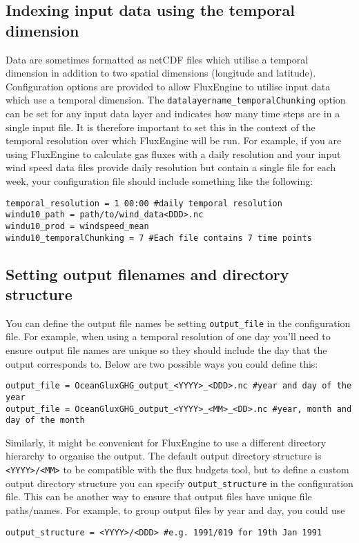 \documentclass[]{scrartcl}
\begin{document}
{\subsection{Indexing input data using the temporal dimension} \label{temporal_dimension_indexing}
Data are sometimes formatted as netCDF files which utilise a temporal dimension in addition to two spatial dimensions (longitude and latitude). Configuration options are provided to allow FluxEngine to utilise input data which use a temporal dimension. The \texttt{datalayername\_temporalChunking} option can be set for any input data layer and indicates how many time steps are in a single input file. It is therefore important to set this in the context of the temporal resolution over which FluxEngine will be run. For example, if you are using FluxEngine to calculate gas fluxes with a daily resolution and your input wind speed data files provide daily resolution but contain a single file for each week, your configuration file should include something like the following:

\begin{lstlisting}
temporal_resolution = 1 00:00 #daily temporal resolution
windu10_path = path/to/wind_data<DDD>.nc
windu10_prod = windspeed_mean
windu10_temporalChunking = 7 #Each file contains 7 time points
\end{lstlisting}


\subsection{Setting output filenames and directory structure} \label{output_filenames}
You can define the output file names be setting \texttt{output\_file} in the configuration file. For example, when using a temporal resolution of one day you'll need to ensure output file names are unique so they should include the day that the output corresponds to. Below are two possible ways you could define this:
\begin{lstlisting}
output_file = OceanGluxGHG_output_<YYYY>_<DDD>.nc #year and day of the year
output_file = OceanGluxGHG_output_<YYYY>_<MM>_<DD>.nc #year, month and day of the month
\end{lstlisting}


Similarly, it might be convenient for FluxEngine to use a different directory hierarchy to organise the output. The default output directory structure is \texttt{<YYYY>/<MM>} to be compatible with the flux budgets tool, but to define a custom output directory structure you can specify \texttt{output\_structure} in the configuration file. This can be another way to ensure that output files have unique file paths/names. For example, to group output files by year and day, you could use
\begin{lstlisting}
output_structure = <YYYY>/<DDD> #e.g. 1991/019 for 19th Jan 1991
\end{lstlisting}

}
\end{document}
